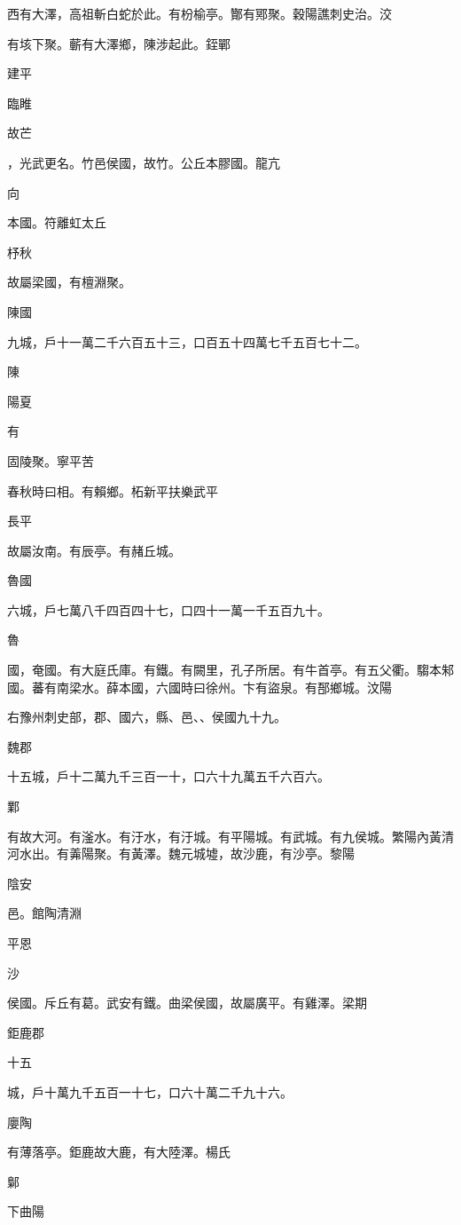 \begin{pinyinscope}
西有大澤，高祖斬白蛇於此。有枌榆亭。酇有鄍聚。穀陽譙刺史治。洨

有垓下聚。蘄有大澤鄉，陳涉起此。銍鄲

建平

臨睢

故芒

，光武更名。竹邑侯國，故竹。公丘本膠國。龍亢

向

本國。符離虹太丘

杼秋

故屬梁國，有檀淵聚。

陳國

九城，戶十一萬二千六百五十三，口百五十四萬七千五百七十二。

陳

陽夏

有

固陵聚。寧平苦

春秋時曰相。有賴鄉。柘新平扶樂武平

長平

故屬汝南。有辰亭。有赭丘城。

魯國

六城，戶七萬八千四百四十七，口四十一萬一千五百九十。

魯

國，奄國。有大庭氏庫。有鐵。有闕里，孔子所居。有牛首亭。有五父衢。騶本邾國。蕃有南梁水。薛本國，六國時曰徐州。卞有盜泉。有郚鄉城。汶陽

右豫州刺史部，郡、國六，縣、邑、、侯國九十九。

魏郡

十五城，戶十二萬九千三百一十，口六十九萬五千六百六。

鄴

有故大河。有滏水。有汙水，有汙城。有平陽城。有武城。有九侯城。繁陽內黃清河水出。有羛陽聚。有黃澤。魏元城墟，故沙鹿，有沙亭。黎陽

陰安

邑。館陶清淵

平恩

沙

侯國。斥丘有葛。武安有鐵。曲梁侯國，故屬廣平。有雞澤。梁期

鉅鹿郡

十五

城，戶十萬九千五百一十七，口六十萬二千九十六。

廮陶

有薄落亭。鉅鹿故大鹿，有大陸澤。楊氏

鄡

下曲陽


\end{pinyinscope}
